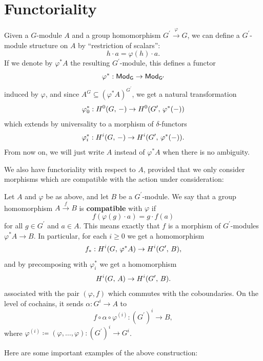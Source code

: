 \documentclass[a4paper, oneside]{memoir}
\begin{document}
\section{Functoriality}

Given a $G$-module $A$ and a group homomorphism $ G^{\prime} \overset{\varphi}{\to} G$, we can define a $G^{\prime} $-module structure on $A$ by ``restriction of scalars'':
\[
	h\cdot a = \varphi(h)\cdot a.
\]
If we denote by $\varphi^* A$ the resulting $G^{\prime} $-module, this defines a functor
\[
	\varphi^* : \mathsf{Mod}_\mathsf{G}\to \mathsf{Mod}_\mathsf{G^\prime}
\]
induced by $\varphi$, and since $A^G\subseteq (\varphi^*A)^{G^{\prime}} $, we get a natural transformation
\[
	\varphi_0^*: H^{0}( G, \, - )\to H^{0}( G^{\prime} , \, \varphi^*(-) )
\]
which extends by universality to a morphism of $\delta$-functors
\[
	\varphi_i^*: H^{i}( G, \, - )\to H^{i}( G^{\prime} , \, \varphi^*(-) )
	.\]
From now on, we will just write $A$ instead of $\varphi^*A$ when there is no ambiguity.

We also have functoriality with respect to $A$, provided that we only consider morphisms which are compatible with the action under consideration:

\begin{definition}
	Let $A$ and $\varphi$ be as above, and let $B$ be a $G^{\prime} $-module. We say that a group homomorphism $A\overset{f}{\to} B$ is \textbf{compatible} with $\varphi$ if
	\[
		f(\varphi(g)\cdot a)=g\cdot f(a)
	\]
	for all $g\in G^{\prime} $ and $a\in A$. This means exactly that $f$ is a morphism of $G^{\prime} $-modules $\varphi^*A\to B$. In particular, for each $i\geq 0$ we get a homomorphism
	\[
		f_*: H^{i}( G, \, \varphi^*A )\to H^{i}( G^{\prime} , \, B ),
	\]
	and by precomposing with $\varphi_i^*$ we get a homomorphism
	\[
		H^{i}( G, \, A )\to H^{i}( G^{\prime} , \, B ).
	\]
	associated with the pair $(\varphi,f)$ which commutes with the coboundaries.
	On the level of cochains, it sends $\alpha: G^i\to A$ to
	\begin{equation*}\label{eq:Explicit} f \circ \alpha \circ \varphi^{(i)}: {(G^{\prime})}^i\to B, \end{equation*}
	where \(\varphi^{(i)} \coloneqq (\varphi, \dots ,\varphi): {(G^{\prime})}^i\to G^i \).
\end{definition}

Here are some important examples of the above construction:
\end{document}
